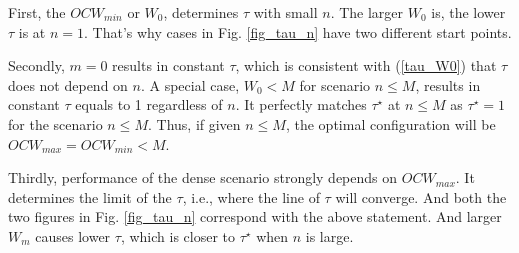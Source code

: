 \documentclass[journal]{IEEEtran}
\begin{document}
First, the $OCW_{min}$ or $W_0$, determines $\tau$ with small $n$. 
The larger $W_0$ is, the lower $\tau$ is at $n=1$.
That's why cases in Fig. \ref{fig_tau_n} have two different start points.

Secondly, $m=0$ results in constant $\tau$, which is consistent with (\ref{tau_W0}) that $\tau$ does not depend on $n$.
A special case, $W_0<M$ for scenario $n\leq M$, results in constant $\tau$ equals to 1 regardless of $n$. 
It perfectly matches $\tau^\star$ at $n\leq M$ as $\tau^\star = 1$ for the scenario $n \leq M$.
Thus, if given $n\leq M$, the optimal configuration will be $OCW_{max}= OCW_{min} < M$. 


Thirdly, performance of the dense scenario strongly depends on $OCW_{max}$.
It determines the limit of the $\tau$, i.e., where the line of $\tau$ will converge. 
And both the two figures in Fig. \ref{fig_tau_n} correspond with the above statement.
And larger $W_m$ causes lower $\tau$, which is closer to $\tau^\star$ when $n$ is large. 
\end{document}
